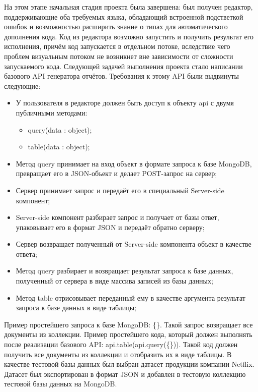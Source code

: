 \documentclass[12pt]{article}
\begin{document}
    На этом этапе начальная стадия проекта была завершена: был получен редактор, поддерживающие оба требуемых языка, обладающий встроенной
    подстветкой ошибок и возможностью расширить знание о типах для автоматического дополнения кода. Код из редактора возможно запустить
    и получить результат его исполнения, причём код запускается в отдельном потоке, вследствие чего проблем визуальным потоком не возникнет
    вне зависимости от сложности запускаемого кода.
    Следующей задачей выполнения проекта стало написании базового API генератора отчётов. Требования к этому API были выдвинуты следующие:
    \begin{itemize}
        \item У пользователя в редакторе должен быть доступ к объекту api с двумя публичными методами:
        \begin{itemize}
            \item query(data : object);
            \item table(data : object);
        \end{itemize}
        \item Метод query принимает на вход объект в формате запроса к базе MongoDB, превращает его в JSON-объект и делает POST-запрос на сервер;
        \item Сервер принимает запрос и передаёт его в специальный Server-side компонент;
        \item Server-side компонент разбирает запрос и получает от базы ответ, упаковывает его в формат JSON и передаёт обратно серверу;
        \item Сервер возвращает полученный от Server-side компонента объект в качестве ответа;
        \item Метод query разбирает и возвращает результат запроса к базе данных, полученный от сервера в виде массива записей из базы данных;
        \item Метод table отрисовывает переданный ему в качестве аргумента результат запроса к базе данных в виде таблицы;
    \end{itemize}
    Пример простейшего запроса к базе MongoDB: \{\}. Такой запрос возвращает все документы из коллекции. Пример простейшего кода, который должен
    выполнять после реализации базового API: api.table(api.query(\{\})). Такой код должен получить все документы из коллекции и отобразить их
    в виде таблицы.
    В качестве тестовой базы данных был выбран датасет продукции компании Netflix. Датасет был экспортирован в формат JSON и добавлен в тестовую
    коллекцию тестовой базы данных на MongoDB.
\end{document}
